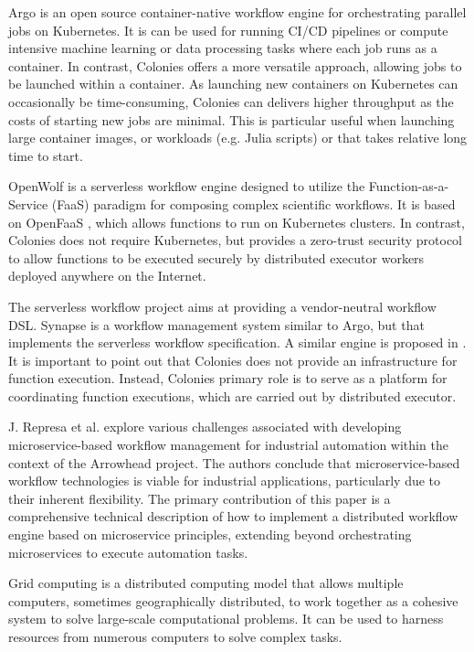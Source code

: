 \documentclass{article}
\begin{document}
Argo \cite{argowf} is an open source container-native workflow engine for orchestrating parallel jobs on Kubernetes. It is can be used for running CI/CD pipelines or compute intensive machine learning or data processing tasks where each job runs as a container. In contrast, Colonies offers a more versatile approach, allowing jobs to be launched within a container. As launching new containers on Kubernetes can occasionally be time-consuming, Colonies can delivers higher throughput as the costs of starting new jobs are minimal. This is particular useful when launching large container images, or workloads (e.g. Julia scripts) or that takes relative long time to start. 

OpenWolf \cite{openwolf} is a serverless workflow engine designed to utilize the Function-as-a-Service (FaaS) paradigm for composing complex scientific workflows. It is based on OpenFaaS \cite{openfaas}, which allows functions to run on Kubernetes clusters. In contrast, Colonies does not require Kubernetes, but provides a zero-trust security protocol to allow functions to be executed securely by distributed executor workers deployed anywhere on the Internet.

The serverless workflow project \cite{serverlessworkflows} aims at providing a vendor-neutral workflow DSL. Synapse \cite{synapse} is a workflow management system similar to Argo, but that implements the serverless workflow specification. A similar engine is proposed in \cite{scafe}. It is important to point out that Colonies does not provide an infrastructure for function execution. Instead, Colonies primary role is to serve as a platform for coordinating function executions, which are carried out by distributed executor.

J. Represa et al. \cite{GarciaRepresa1740746} explore various challenges associated with developing microservice-based workflow management for industrial automation within the context of the Arrowhead project. The authors conclude that microservice-based workflow technologies is viable for industrial applications, particularly due to their inherent flexibility. The primary contribution of this paper is a comprehensive technical description of how to implement a distributed workflow engine based on microservice principles, extending beyond orchestrating microservices to execute automation tasks.

Grid computing is a distributed computing model that allows multiple computers, sometimes geographically distributed, to work together as a cohesive system to solve large-scale computational problems. It can be used to harness resources from numerous computers to solve complex tasks.
\end{document}
